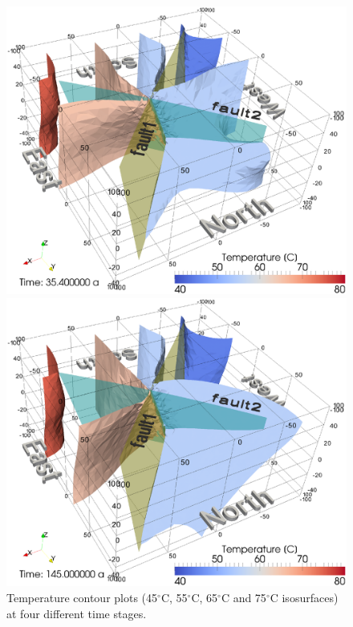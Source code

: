 \begin{figure}[htbp]
\begin{center}
        \begin{minipage}{0.35\textwidth}
            \includegraphics[width=1\textwidth]{T/figures/2u2f_fig5c.eps}
        \end{minipage}
        \begin{minipage}{0.35\textwidth}
            \includegraphics[width=1\textwidth]{T/figures/2u2f_fig5d.eps}
        \end{minipage}
        \caption{Temperature contour plots (45$^\circ{}$C, 55$^\circ{}$C, 65$^\circ{}$C and 75$^\circ{}$C isosurfaces) at four different time stages.}
        \label{fig5}
    \end{center}
\end{figure}

